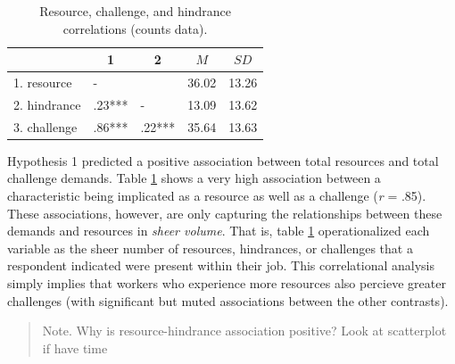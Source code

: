 \documentclass[
  man]{apa6}
\begin{document}
\begin{table}[tbp]

\begin{center}
\begin{threeparttable}

\caption{\label{tab:cortab}Resource, challenge, and hindrance correlations (counts data).}

\begin{tabular}{lllll}
\toprule
 & \multicolumn{1}{c}{1} & \multicolumn{1}{c}{2} & \multicolumn{1}{c}{$M$} & \multicolumn{1}{c}{$SD$}\\
\midrule
1. resource & - &  & 36.02 & 13.26\\
2. hindrance & .23*** & - & 13.09 & 13.62\\
3. challenge & .86*** & .22*** & 35.64 & 13.63\\
\bottomrule
\end{tabular}

\end{threeparttable}
\end{center}

\end{table}

Hypothesis 1 predicted a positive association between total resources and total challenge demands. Table \ref{tab:cortab} shows a very high association between a characteristic being implicated as a resource as well as a challenge (\emph{r} = .85). These associations, however, are only capturing the relationships between these demands and resources in \emph{sheer volume}. That is, table \ref{tab:cortab} operationalized each variable as the sheer number of resources, hindrances, or challenges that a respondent indicated were present within their job. This correlational analysis simply implies that workers who experience more resources also percieve greater challenges (with significant but muted associations between the other contrasts).

\begin{quote}
Note. Why is resource-hindrance association positive? Look at scatterplot if have time
\end{quote}
\end{document}
